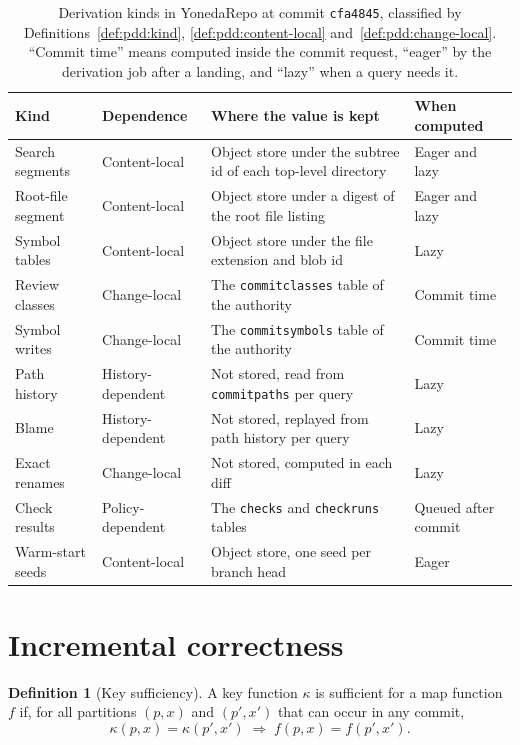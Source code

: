 \documentclass[11pt,letterpaper]{article}
\theoremstyle{definition}
\newtheorem{definition}[theorem]{Definition}
\theoremstyle{remark}
\DeclareRobustCommand{\code}[1]{{\def\_{\textunderscore\allowbreak}\texttt{#1}}}
\begin{document}
\begin{table}[t]
\centering
\small
\caption{Derivation kinds in YonedaRepo at commit \code{cfa4845}, classified by Definitions~\ref{def:pdd:kind}, \ref{def:pdd:content-local} and~\ref{def:pdd:change-local}. ``Commit time'' means computed inside the commit request, ``eager'' by the derivation job after a landing, and ``lazy'' when a query needs it.}
\label{tab:pdd:kinds}
\begin{tabularx}{\textwidth}{@{}L{2.6cm}L{2.2cm}YL{2.4cm}@{}}
\toprule
Kind & Dependence & Where the value is kept & When computed \\
\midrule
Search segments & Content-local & Object store under the subtree id of each top-level directory & Eager and lazy \\
Root-file segment & Content-local & Object store under a digest of the root file listing & Eager and lazy \\
Symbol tables & Content-local & Object store under the file extension and blob id & Lazy \\
Review classes & Change-local & The \code{commit\_classes} table of the authority & Commit time \\
Symbol writes & Change-local & The \code{commit\_symbols} table of the authority & Commit time \\
Path history & History-dependent & Not stored, read from \code{commit\_paths} per query & Lazy \\
Blame & History-dependent & Not stored, replayed from path history per query & Lazy \\
Exact renames & Change-local & Not stored, computed in each diff & Lazy \\
Check results & Policy-dependent & The \code{checks} and \code{check\_runs} tables & Queued after commit \\
Warm-start seeds & Content-local & Object store, one seed per branch head & Eager \\
\bottomrule
\end{tabularx}
\end{table}

\section{Incremental correctness}
\label{sec:pdd:incremental}

\begin{definition}[Key sufficiency]
\label{def:pdd:key-sufficiency}
A key function $\kappa$ is sufficient for a map function $f$ if, for all partitions $(p,x)$ and $(p',x')$ that can occur in any commit,
\[
\kappa(p,x)=\kappa(p',x')\;\Longrightarrow\;f(p,x)=f(p',x').
\]
\end{definition}
\end{document}
